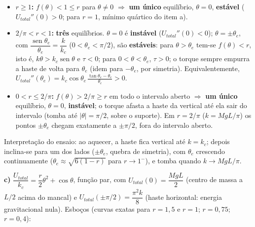 \documentclass{article}%
\begin{document}
\begin{itemize}
\item \textbf{$r\ge1$:} $f(\theta)<1\le r$ para $\theta\neq0$ $\Rightarrow$ \textbf{um único} equilíbrio, $\theta=0$, \textbf{estável} ($U_{total}''(0)>0$; para $r=1$, mínimo quártico do item a).
\item \textbf{$2/\pi<r<1$:} \textbf{três} equilíbrios. $\theta=0$ é \textbf{instável} ($U_{total}''(0)<0$); $\theta=\pm\theta_e$, com $\dfrac{\operatorname{sen}\theta_e}{\theta_e}=\dfrac{k}{k_c}$ ($0<\theta_e<\pi/2$), são \textbf{estáveis}: para $\theta>\theta_e$ tem-se $f(\theta)<r$, isto é, $k\theta>k_c\operatorname{sen}\theta$ e $\tau<0$; para $0<\theta<\theta_e$, $\tau>0$; o torque sempre empurra a haste de volta para $\theta_e$ (idem para $-\theta_e$, por simetria). Equivalentemente, $U_{total}''(\theta_e)=k_c\cos\theta_e\,\frac{\tan\theta_e-\theta_e}{\theta_e}>0$.
\item \textbf{$0<r\le2/\pi$:} $f(\theta)>2/\pi\ge r$ em todo o intervalo aberto $\Rightarrow$ \textbf{um único} equilíbrio, $\theta=0$, \textbf{instável}; o torque afasta a haste da vertical até ela sair do intervalo (tomba até $|\theta|=\pi/2$, sobre o suporte). Em $r=2/\pi$ ($k=MgL/\pi$) os pontos $\pm\theta_e$ chegam exatamente a $\pm\pi/2$, fora do intervalo aberto.
\end{itemize}
Interpretação do ensaio: ao aquecer, a haste fica vertical até $k=k_c$; depois inclina-se para um dos lados ($\pm\theta_e$, quebra de simetria), com $\theta_e$ crescendo continuamente ($\theta_e\approx\sqrt{6(1-r)}$ para $r\to1^-$), e tomba quando $k\to MgL/\pi$.

\textbf{c)} $\dfrac{U_{total}}{k_c}=\dfrac{r}{2}\theta^2+\cos\theta$, função par, com $U_{total}(0)=\dfrac{MgL}{2}$ (centro de massa a $L/2$ acima do mancal) e $U_{total}(\pm\pi/2)=\dfrac{\pi^2k}{8}$ (haste horizontal: energia gravitacional nula). Esboços (curvas exatas para $r=1{,}5$ e $r=1$; $r=0{,}75$; $r=0{,}4$):
\end{document}
